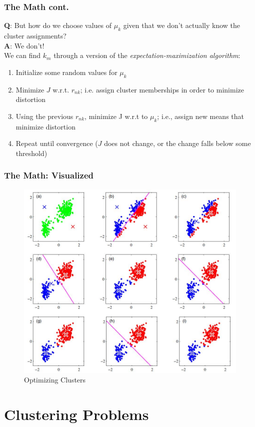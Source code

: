 \documentclass{beamer}
\begin{document}
\begin{frame}
\frametitle{The Math cont.}
	\textbf{Q}: But how do we choose values of $\mu_k$ given that we don't actually know the cluster assignments?\\
	\textbf{A}: We don't!\\
	We can find $k_m$ through a version of the \textit{expectation-maximization algorithm}:
	\begin{enumerate}
		\item Initialize some random values for $\mu_k$
		\item Minimize $J$ w.r.t. $r_{nk}$; i.e. assign cluster memberships in order to minimize distortion
		\item Using the previous $r_{nk}$, minimize J w.r.t to $\mu_k$; i.e., assign new means that minimize distortion
		\item Repeat until convergence ($J$ does not change, or the change falls below some threshold)
	\end{enumerate}

\end{frame}

\begin{frame}
 \frametitle{The Math: Visualized}
 \begin{figure}
 	\centering
 	\includegraphics[width=0.7\linewidth]{bishopkmeans}
 	\caption{Optimizing Clusters}
 	\label{fig:bishopkmeans}
 \end{figure}
 
\end{frame}

\section{Clustering Problems}
\end{document}

